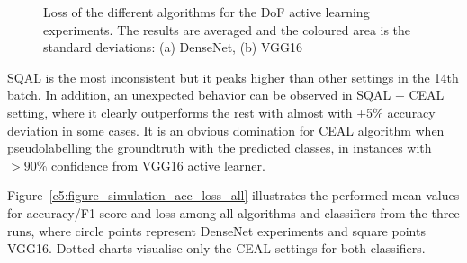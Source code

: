 \begin{figure}[h!]
    \centering  
    \caption{Loss of the different algorithms for the DoF active learning experiments. The results are averaged and the coloured area is the standard deviations: (a) DenseNet, (b) VGG16}
    \label{c5:figure_simulation_loss_densenet_vgg}
\end{figure}


SQAL is the most inconsistent but it peaks higher than other settings in the 14th batch. In addition, an unexpected behavior can be observed in SQAL + CEAL setting, where it clearly outperforms the rest with almost with +5\% accuracy deviation in some cases. It is an obvious domination for CEAL algorithm when pseudolabelling the groundtruth with the predicted classes, in instances with $>90\%$ confidence from VGG16 active learner.


Figure~\ref{c5:figure_simulation_acc_loss_all} illustrates the performed mean values for accuracy/F1-score and loss among all algorithms and classifiers from the three runs, where circle points represent DenseNet experiments and square points VGG16. Dotted charts visualise only the CEAL settings for both classifiers.

